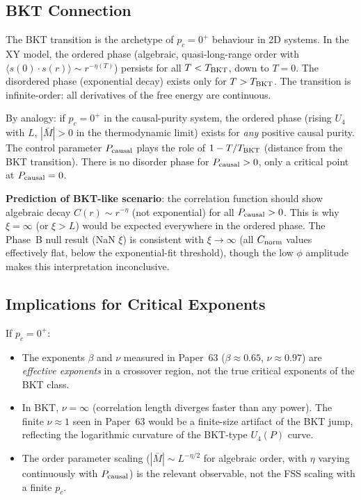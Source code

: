 \documentclass[12pt,a4paper]{article}
\begin{document}
\subsection{BKT Connection}

The BKT transition is the archetype of $p_c = 0^+$ behaviour in 2D systems.
In the XY model, the ordered phase (algebraic, quasi-long-range order with
$\langle s(0)\cdot s(r)\rangle \sim r^{-\eta(T)}$)
persists for all $T < T_{\rm BKT}$, down to $T = 0$.
The disordered phase (exponential decay) exists only for $T > T_{\rm BKT}$.
The transition is infinite-order: all derivatives of the free energy are
continuous.

By analogy:
if $p_c = 0^+$ in the causal-purity system, the ordered phase
(rising $U_4$ with $L$, $|\bar{M}| > 0$ in the thermodynamic limit)
exists for \emph{any} positive causal purity.
The control parameter $P_{\rm causal}$ plays the role of
$1 - T/T_{\rm BKT}$ (distance from the BKT transition).
There is no disorder phase for $P_{\rm causal} > 0$,
only a critical point at $P_{\rm causal} = 0$.

\textbf{Prediction of BKT-like scenario}:
the correlation function should show algebraic decay
$C(r) \sim r^{-\eta}$ (not exponential) for all $P_{\rm causal} > 0$.
This is why $\xi = \infty$ (or $\xi > L$) would be expected everywhere in the ordered phase.
The Phase~B null result (NaN $\xi$) is consistent with $\xi \to \infty$
(all $C_{\rm norm}$ values effectively flat, below the exponential-fit threshold),
though the low $\phi$ amplitude makes this interpretation inconclusive.

\subsection{Implications for Critical Exponents}

If $p_c = 0^+$:
\begin{itemize}
  \item The exponents $\beta$ and $\nu$ measured in Paper~63
    ($\beta \approx 0.65$, $\nu \approx 0.97$) are \emph{effective exponents}
    in a crossover region, not the true critical exponents of the BKT class.
  \item In BKT, $\nu = \infty$ (correlation length diverges faster than any power).
    The finite $\nu \approx 1$ seen in Paper~63 would be a finite-size artifact
    of the BKT jump, reflecting the logarithmic curvature of the
    BKT-type $U_4(P)$ curve.
  \item The order parameter scaling ($|\bar{M}| \sim L^{-\eta/2}$ for algebraic order,
    with $\eta$ varying continuously with $P_{\rm causal}$) is the relevant
    observable, not the FSS scaling with a finite $p_c$.
\end{itemize}
\end{document}
